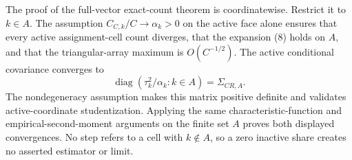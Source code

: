 The proof of the full-vector exact-count theorem is coordinatewise.  Restrict it to \(k\in A\).  The assumption \(C_{C,k}/C\to\alpha_k>0\) on the active face alone ensures that every active assignment-cell count diverges, that the expansion (8) holds on \(A\), and that the triangular-array maximum is \(O(C^{-1/2})\).  The active conditional covariance converges to
\[
 \operatorname{diag}(\tau_k^2/\alpha_k:k\in A)=\Sigma_{CR,A}.
\]
The nondegeneracy assumption makes this matrix positive definite and validates active-coordinate studentization.  Applying the same characteristic-function and empirical-second-moment arguments on the finite set \(A\) proves both displayed convergences.  No step refers to a cell with \(k\notin A\), so a zero inactive share creates no asserted estimator or limit.